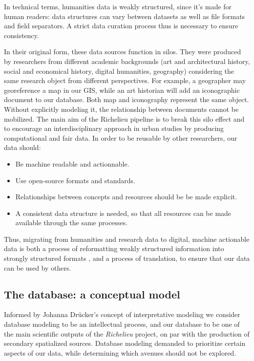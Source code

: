 \documentclass[12pt, a4paper, twocolumn]{article}
\begin{document}
In technical terms, humanities data is weakly structured, since it's made for human readers: data structures can vary between datasets as well as file formats and field separators. A strict data curation process thus is necessary to ensure consistency. 

In their original form, these data sources function in silos. They were produced by researchers from different academic backgrounds (art and architectural history, social and economical history, digital humanities, geography) considering the same research object from different perspectives. For example, a geographer may georeference a map in our GIS, while an art historian will add an iconographic document to our database. Both map and iconography represent the same object. Without explicitly modeling it, the relationship between documents cannot be mobilized. The main aim of the Richelieu pipeline is to break this silo effect and to encourage an interdisciplinary approach in urban studies by producing computational and \acs{fair} data. In order to be reusable by other researchers, our data should:

\begin{itemize}
    \item Be machine readable and actionnable.
    \item Use open-source formats and standards.
    \item Relationships between concepts and resources should be be made explicit.
    \item A consistent data structure is needed, so that all resources can be made available through the same processes.
\end{itemize}

Thus, migrating from humanities and research data to digital, machine actionable data is both a process of reformatting weakly structured information into strongly structured formats \parencite[5]{kembellec:hal-02306958}, and a process of translation, to ensure that our data can be used by others.

\subsection{The database: a conceptual model}

Informed by Johanna Drücker's concept of interpretative modeling \parencite[103-130]{druckerVisualisationInterpretationModelisante2020a} we consider database modeling to be an intellectual process, and our database to be one of the main scientific outputs of the \textit{Richelieu} project, on par with the production of secondary spatialized sources. Database modeling demanded to prioritize certain aspects of our data, while determining which avenues should not be explored.
\end{document}
